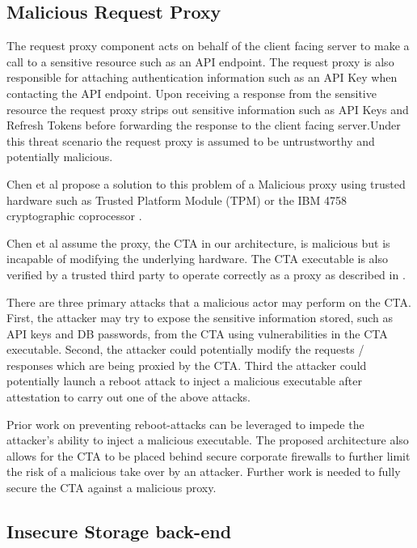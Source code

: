 \documentclass{sig-alternate-05-2015}
\begin{document}
\subsection{Malicious Request Proxy}

The request proxy component acts on behalf of the client facing server to make a call to a sensitive resource such as an API endpoint. The request proxy is also responsible for attaching authentication information such as an API Key when contacting the API endpoint. Upon receiving a response from the sensitive resource the request proxy strips out sensitive information such as API Keys and Refresh Tokens before forwarding the response to the client facing server.Under this threat scenario the request proxy is assumed to be untrustworthy and potentially malicious.

Chen et al \cite{chen_towards_2012} propose a solution to this problem of a Malicious proxy using trusted hardware such as Trusted Platform Module (TPM) or the IBM 4758 cryptographic coprocessor \cite{parno_bootstrapping_2010}. 

Chen et al assume the proxy, the CTA in our architecture, is malicious but is incapable of modifying the underlying hardware. The CTA executable is also verified by a trusted third party to operate correctly as a proxy as described in \cite{parno_bootstrapping_2010}.

There are three primary attacks that a malicious actor may perform on the CTA. First, the attacker may try to expose the sensitive information stored, such as API keys and DB passwords, from the CTA using vulnerabilities in the CTA executable. Second, the attacker could potentially modify the requests / responses which are being proxied by the CTA. Third the attacker could potentially launch a reboot attack to inject a malicious executable after attestation to carry out one of the above attacks.

Prior work \cite{libert_tracing_2008, mccune_flicker:_2008} on preventing reboot-attacks can be leveraged to impede the attacker's ability to inject a malicious executable. The proposed architecture also allows for the CTA to be placed behind secure corporate firewalls to further limit the risk of a malicious take over by an attacker. Further work is needed to fully secure the CTA against a malicious proxy.

\subsection{Insecure Storage back-end}
\end{document}
